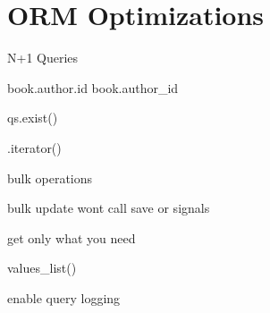\documentclass[a5paper,10pt,english]{sphinxmanual}
\begin{document}
\chapter{ORM Optimizations}
\label{\detokenize{orm_optimizations:orm-optimizations}}\label{\detokenize{orm_optimizations::doc}}
N+1 Queries

book.author.id
book.author\_id

qs.exist()

.iterator()

bulk operations

bulk update wont call save or signals

get only what you need

values\_list()

enable query logging



\renewcommand{\indexname}{Index}
\printindex
\end{document}
